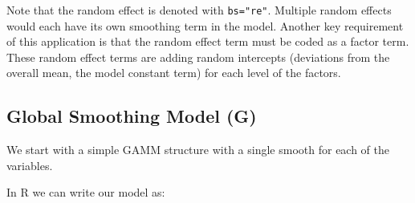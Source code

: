 \documentclass[
]{book}
\begin{document}
Note that the random effect is denoted with \texttt{bs="re"}. Multiple random effects would each have its own smoothing term in the model. Another key requirement of this application is that the random effect term must be coded as a factor term. These random effect terms are adding random intercepts (deviations from the overall mean, the model constant term) for each level of the factors.

\hypertarget{global-smoothing-model-g}{%
\subsection{Global Smoothing Model (G)}\label{global-smoothing-model-g}}

We start with a simple GAMM structure with a single smooth for each of the variables.

In R we can write our model as:
\end{document}
